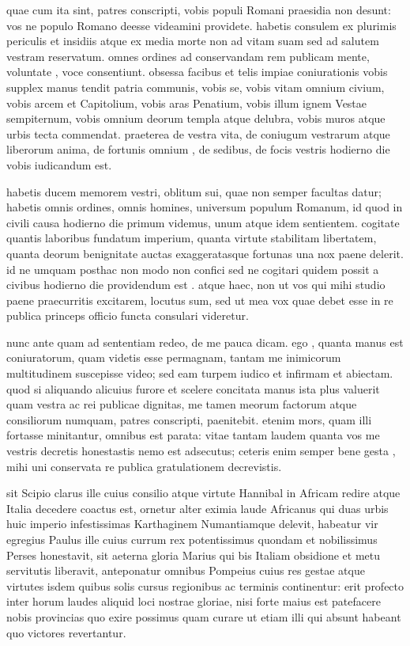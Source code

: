  quae cum ita sint, patres conscripti, vobis populi Romani praesidia non desunt: vos ne populo Romano deesse videamini providete. habetis consulem ex plurimis periculis et insidiis atque ex media morte non ad vitam suam sed ad salutem vestram reservatum. omnes ordines ad conservandam rem publicam mente, voluntate , voce consentiunt. obsessa facibus et telis impiae coniurationis vobis supplex manus tendit patria communis, vobis se, vobis vitam omnium civium, vobis arcem et Capitolium, vobis aras Penatium, vobis illum ignem Vestae sempiternum, vobis omnium deorum templa atque delubra, vobis muros atque urbis tecta commendat. praeterea de vestra vita, de coniugum vestrarum atque liberorum anima, de fortunis omnium , de sedibus, de focis vestris hodierno die vobis iudicandum est.

 habetis ducem memorem vestri, oblitum sui, quae non semper facultas datur; habetis omnis ordines, omnis homines, universum populum Romanum, id quod in civili causa hodierno die primum videmus, unum atque idem sentientem. cogitate quantis laboribus fundatum imperium, quanta virtute stabilitam libertatem, quanta deorum benignitate auctas exaggeratasque fortunas una nox paene delerit. id ne umquam posthac non modo non confici sed ne cogitari quidem possit a civibus hodierno die providendum est . atque haec, non ut vos qui mihi studio paene praecurritis excitarem, locutus sum, sed ut mea vox quae debet esse in re publica princeps officio functa consulari videretur.

 nunc ante quam ad sententiam redeo, de me pauca dicam. ego , quanta manus est coniuratorum, quam videtis esse permagnam, tantam me inimicorum multitudinem suscepisse video; sed eam turpem iudico et infirmam et abiectam. quod si aliquando alicuius furore et scelere concitata manus ista plus valuerit quam vestra ac rei publicae dignitas, me tamen meorum factorum atque consiliorum numquam, patres conscripti, paenitebit. etenim mors, quam illi fortasse minitantur, omnibus est parata: vitae tantam laudem quanta vos me vestris decretis honestastis nemo est adsecutus; ceteris enim semper bene gesta , mihi uni conservata re publica gratulationem decrevistis.

 sit Scipio clarus ille cuius consilio atque virtute Hannibal in Africam redire atque Italia decedere coactus est, ornetur alter eximia laude Africanus qui duas urbis huic imperio infestissimas Karthaginem Numantiamque delevit, habeatur vir egregius Paulus ille cuius currum rex potentissimus quondam et nobilissimus Perses honestavit, sit aeterna gloria Marius qui bis Italiam obsidione et metu servitutis liberavit, anteponatur omnibus Pompeius cuius res gestae atque virtutes isdem quibus solis cursus regionibus ac terminis continentur: erit profecto inter horum laudes aliquid loci nostrae gloriae, nisi forte maius est patefacere nobis provincias quo exire possimus quam curare ut etiam illi qui absunt habeant quo victores revertantur.

